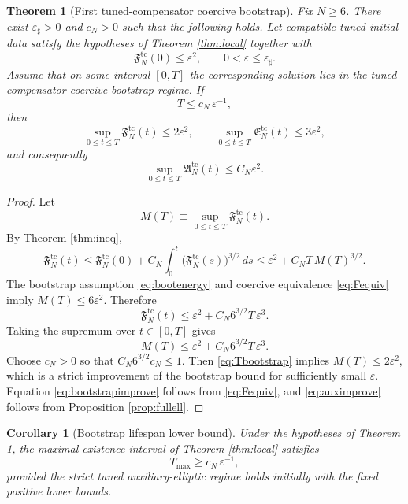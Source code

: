 \documentclass[11pt]{article}
\newtheorem{corollary}{Corollary}
\newtheorem{theorem}{Theorem}
\begin{document}
\begin{theorem}[First tuned-compensator coercive bootstrap]
\label{thm:bootstrap}
Fix \(N\ge 6\). There exist \(\varepsilon_\sharp>0\) and \(c_N>0\) such that the following holds. Let compatible tuned initial data satisfy the hypotheses of Theorem \ref{thm:local} together with
\begin{equation}
\mathfrak F_N^{\mathrm{tc}}(0)\le \varepsilon^2,
\qquad
0<\varepsilon\le \varepsilon_\sharp.
\label{eq:initsmall}
\end{equation}
Assume that on some interval \([0,T]\) the corresponding solution lies in the tuned-compensator coercive bootstrap regime. If
\begin{equation}
T\le c_N\,\varepsilon^{-1},
\label{eq:Tbootstrap}
\end{equation}
then
\begin{equation}
\sup_{0\le t\le T}\mathfrak F_N^{\mathrm{tc}}(t)\le 2\varepsilon^2,
\qquad
\sup_{0\le t\le T}\mathfrak E_N^{\mathrm{tc}}(t)\le 3\varepsilon^2,
\label{eq:bootstrapimprove}
\end{equation}
and consequently
\begin{equation}
\sup_{0\le t\le T}\mathfrak A_N^{\mathrm{tc}}(t)\le C_N\varepsilon^2.
\label{eq:auximprove}
\end{equation}
\end{theorem}

\begin{proof}
Let
\[
M(T)\equiv \sup_{0\le t\le T}\mathfrak F_N^{\mathrm{tc}}(t).
\]
By Theorem \ref{thm:ineq},
\[
\mathfrak F_N^{\mathrm{tc}}(t)
\le
\mathfrak F_N^{\mathrm{tc}}(0)
+C_N\int_0^t
\bigl(\mathfrak F_N^{\mathrm{tc}}(s)\bigr)^{3/2}\,ds
\le
\varepsilon^2+C_NT\,M(T)^{3/2}.
\]
The bootstrap assumption \eqref{eq:bootenergy} and coercive equivalence \eqref{eq:Fequiv} imply \(M(T)\le 6\varepsilon^2\). Therefore
\[
\mathfrak F_N^{\mathrm{tc}}(t)
\le
\varepsilon^2+C_N 6^{3/2}T\,\varepsilon^3.
\]
Taking the supremum over \(t\in[0,T]\) gives
\[
M(T)\le \varepsilon^2+C_N 6^{3/2}T\,\varepsilon^3.
\]
Choose \(c_N>0\) so that \(C_N6^{3/2}c_N\le 1\). Then \eqref{eq:Tbootstrap} implies \(M(T)\le 2\varepsilon^2\), which is a strict improvement of the bootstrap bound for sufficiently small \(\varepsilon\). Equation \eqref{eq:bootstrapimprove} follows from \eqref{eq:Fequiv}, and \eqref{eq:auximprove} follows from Proposition \ref{prop:fullell}.
\end{proof}

\begin{corollary}[Bootstrap lifespan lower bound]
\label{cor:lifespan}
Under the hypotheses of Theorem \ref{thm:bootstrap}, the maximal existence interval of Theorem \ref{thm:local} satisfies
\begin{equation}
T_{\max}\ge c_N\,\varepsilon^{-1},
\label{eq:lifespan}
\end{equation}
provided the strict tuned auxiliary-elliptic regime holds initially with the fixed positive lower bounds.
\end{corollary}
\end{document}

